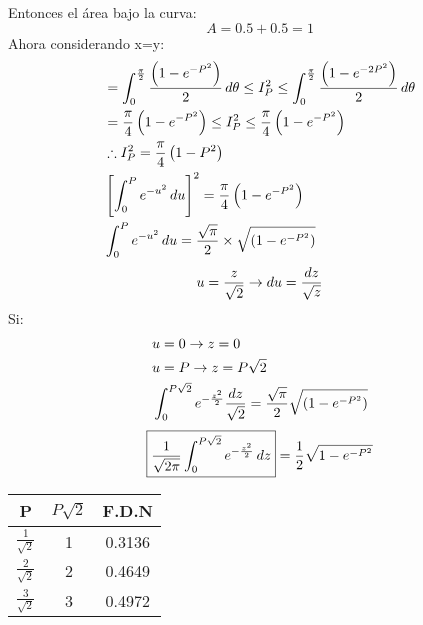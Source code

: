 \documentclass[
	12pt, %
	fleqn, %
	a4paper, %
	oneside, %
]{LegrandOrangeBook}
\begin{document}
\begin{theorem}[Demostrar $\int_0^{\infty}e^{-u^2}\diff u=\frac{\sqrt{\pi}}{2}$]
Entonces el área bajo la curva:
\begin{displaymath}
A=0.5+0.5=1
\end{displaymath}
Ahora considerando x=y:
\begin{align*}
&=\int_0^{\frac{\pi}{2}}\frac{\left(1-e^{-P^2}\right)}{2}\mathop{}\!d\theta\leq I_P^2\leq \int_0^{\frac{\pi}{2}}\frac{\left(1-e^{-2P^2}\right)}{2}\mathop{}\!d\theta\\
&=\frac{\pi}{4}\left(1-e^{-P^2}\right)\leq I_P^2\leq\frac{\pi}{4}\left(1-e^{-P^2}\right)\\
&\therefore I_P^2=\frac{\pi}{4}\left(1-P^2\right)\\
&\left[\int_0^Pe^{-u^2}\mathop{}\!d u\right]^2=\frac{\pi}{4}\left(1-e^{-P^2}\right)\\
&\int_0^Pe^{-u^2}\mathop{}\!d u=\frac{\sqrt{\pi}}{2}\times\sqrt{(1-e^{-P^2})}
\end{align*}
\begin{displaymath}
u=\frac{z}{\sqrt{2}}\rightarrow\mathop{}\!d u=\frac{dz}{\sqrt{z}}
\end{displaymath}
Si:
\begin{align*}
&u=0\rightarrow z=0\\
&u=P\rightarrow z=P\sqrt{2}\\
&\int_0^{P\sqrt{2}}e^{-\frac{z^2}{2}}\frac{\mathop{}\!d z}{\sqrt{2}}=\frac{\sqrt{\pi}}{2}\sqrt{(1-e^{-P^2})}
\end{align*}
\begin{equation*}
\boxed{\frac{1}{\sqrt{2\pi}}\int_0^{P\sqrt{2}}e^{-\frac{z^2}{2}}\mathop{}\!d z}=\frac{1}{2}\sqrt{1-e^{-P^2}}
\end{equation*}
\begin{center}
\begin{tabular}{|c|c|c|}
\hline
P                    & $P\sqrt{2}$ & F.D.N  \\ \hline
$\frac{1}{\sqrt{2}}$ & 1           & 0.3136 \\ \hline
$\frac{2}{\sqrt{2}}$ & 2           & 0.4649 \\ \hline
$\frac{3}{\sqrt{2}}$ & 3           & 0.4972 \\ \hline
\end{tabular}
\end{center}
\end{theorem}
\end{document}
